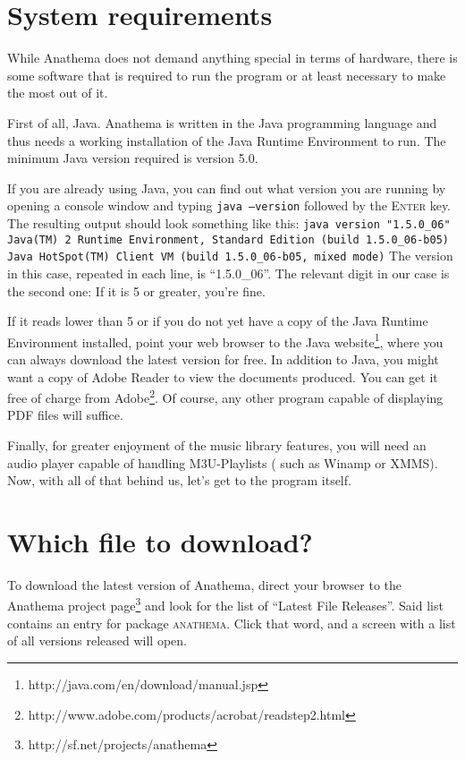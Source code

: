 \section{System requirements}
While Anathema does not demand anything special in terms of hardware, there is some software that is required to run the program or at least necessary to make the most out of it.

First of all, Java. Anathema is written in the Java programming language and thus needs a working installation of the Java Runtime Environment to run. The minimum Java version required is version 5.0.

If you are already using Java, you can find out what version you are running by opening a console window and typing \texttt{java --version} followed by the \textsc{Enter} key. The resulting output should look something like this:
\medskip
\newline
\small
\texttt{java version "1.5.0\_06"
\newline
Java(TM) 2 Runtime Environment, Standard Edition (build 1.5.0\_06-b05)
\newline
Java HotSpot(TM) Client VM (build 1.5.0\_06-b05, mixed mode)}
\medskip
\newline
\normalsize
The version in this case, repeated in each line, is ``1.5.0\_06''. The relevant digit in our case is the second one: If it is 5 or greater, you're fine.

If it reads lower than 5 or if you do not yet have a copy of the Java Runtime Environment installed, point your web browser to the Java website\footnote{http://java.com/en/download/manual.jsp}, where you can always download the latest version for free.
\medskip
\newline
In addition to Java, you might want a copy of Adobe Reader to view the documents produced. You can get it free of charge from Adobe\footnote{http://www.adobe.com/products/acrobat/readstep2.html}. Of course, any other program capable of displaying PDF files will suffice.

Finally, for greater enjoyment of the music library features, you will need an audio player capable of handling M3U-Playlists ( such as Winamp or XMMS).
\medskip
\newline
Now, with all of that behind us, let's get to the program itself.

\section{Which file to download?}
To download the latest version of Anathema, direct your browser to the Anathema project page\footnote{http://sf.net/projects/anathema} and look for the list of ``Latest File Releases''. Said list contains an entry for package \textsc{anathema}. Click that word, and a screen with a list of all versions released will open.

